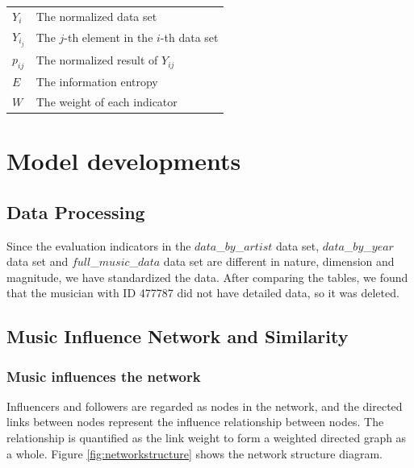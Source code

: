 \documentclass[12pt]{article}  %
\begin{document}
\begin{table}[h]
\begin{center}
\begin{tabular}{ll}
    $Y_i$ &\multicolumn{1}{p{0.75\columnwidth}}{The normalized data set }\\
    $Y_i_j$ &\multicolumn{1}{p{0.75\columnwidth}}{The $j$-th element in the $i$-th data set}\\
    $p_{ij}$ &\multicolumn{1}{p{0.75\columnwidth}}{The normalized result of $Y_{ij}$}\\
    $E$ &\multicolumn{1}{p{0.75\columnwidth}}{The information entropy}\\
    $W$ &\multicolumn{1}{p{0.75\columnwidth}}{The weight of each indicator}\\
	\bottomrule
\end{tabular}\label{tb:notation}
\end{center}
\end{table}

\section{Model developments}

\subsection{Data Processing}
Since the evaluation indicators in the $data$\_$by$\_$artist$ data set,  $data$\_$by$\_$year$ data set and $full$\_$music$\_$data$ data set are different in nature, dimension and magnitude, we have standardized the data. 
After comparing the tables, we found that the musician with ID 477787 did not have detailed data, so it was deleted.

\subsection{Music Influence Network and Similarity}

\subsubsection{Music influences the network}
 Influencers and followers are regarded as nodes in the network, and the directed links between nodes represent the influence relationship between nodes. The relationship is quantified as the link weight to form a weighted directed graph as a whole. Figure \ref{fig:networkstructure} shows the network structure diagram.
\end{document}
